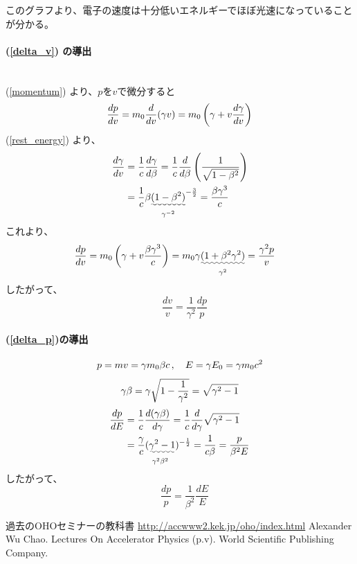 \documentclass[10pt,a4paper]{jlreq}
\begin{document}
このグラフより、電子の速度は十分低いエネルギーでほぼ光速になっていることが分かる。
%
\paragraph{(\ref{delta_v}) の導出} \leavevmode\\

(\ref{momentum}) より、$p$を$v$で微分すると
%
\begin{equation}
  \frac{dp}{dv} = m_0\frac{d}{dv}(\gamma v)
  = m_0 \left(\gamma + v \frac{d\gamma}{dv}\right) \notag
\end{equation}
%
(\ref{rest_energy}) より、
%
\begin{align}
  \frac{d\gamma}{dv} & = \frac{1}{c}\frac{d\gamma}{d\beta}= \frac{1}{c}\frac{d}{d\beta}\left(\frac{1}{\sqrt{1-\beta^2}}\right) \notag \\
  & = \frac{1}{c} \beta \underset{\gamma^{-2}}{\uwave{(1-\beta^2)}}^{-\frac{3}{2}} = \frac{\beta \gamma^3}{c} \notag
\end{align}
%
これより、
\begin{align}
  \frac{dp}{dv} & = m_0 \left(\gamma + v \frac{\beta \gamma^3}{c}\right)
  = m_0 \gamma \underset{\gamma^2}{\uwave{(1 + \beta^2 \gamma^2)}}
  = \frac{\gamma^2 p}{v} \notag
\end{align}
%
したがって、
%
\begin{equation}
  \quad \frac{dv}{v} = \frac{1}{\gamma^2}\frac{dp}{p}
  \label{dv_dp}
\end{equation}
%
\paragraph{(\ref{delta_p})の導出}
%
\begin{align}
  p = mv = \gamma m_0 \beta c\,  , \quad E = \gamma E_0 = \gamma m_0 c^2 \notag
\end{align}
%
\begin{equation}
  \gamma \beta = \gamma \sqrt{1-\frac{1}{\gamma^2}} \notag = \sqrt{\gamma^2 -1} \notag
\end{equation}
%
\begin{align}
  \frac{dp}{dE} & = \frac{1}{c}\frac{d(\gamma \beta)}{d\gamma} = \frac{1}{c}\frac{d}{d\gamma}\sqrt{\gamma^2 -1} \notag \\
  & = \frac{\gamma}{c} \underset{\gamma^2\beta^2}{(\uwave{\gamma^2 -1}})^{-\frac{1}{2}} = \frac{1}{c\beta}
  = \frac{p}{\beta^2 E}\notag
\end{align}
%
したがって、
%
\begin{equation}
  \quad \frac{dp}{p} = \frac{1}{\beta^2}\frac{dE}{E}
  \label{dp_de}
\end{equation}

%
\begin{thebibliography}{9}
  過去のOHOセミナーの教科書 \url{http://accwww2.kek.jp/oho/index.html}
  Alexander Wu Chao. Lectures On Accelerator Physics (p.v). World Scientific Publishing Company. 
\end{thebibliography}
%
\end{document}
